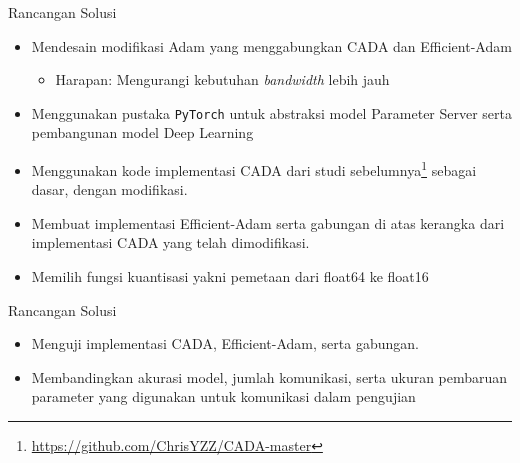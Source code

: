 \begin{frame}{Rancangan Solusi}
  \begin{itemize}
    \item Mendesain modifikasi Adam yang menggabungkan CADA \parencite{Chen2021CADA} dan Efficient-Adam \parencite{Chen2022Efficient}
          \begin{itemize}
            \item Harapan: Mengurangi kebutuhan \textit{bandwidth} lebih jauh
          \end{itemize}
    \item Menggunakan pustaka \texttt{PyTorch} untuk abstraksi model Parameter Server serta pembangunan model Deep Learning
    \item Menggunakan kode implementasi CADA dari studi sebelumnya\footnote{\url{https://github.com/ChrisYZZ/CADA-master}} sebagai dasar, dengan modifikasi.
    \item Membuat implementasi Efficient-Adam serta gabungan di atas kerangka dari implementasi CADA yang telah dimodifikasi.
    \item Memilih fungsi kuantisasi yakni pemetaan dari float64 ke float16
  \end{itemize}
\end{frame}

\begin{frame}{Rancangan Solusi}
  \begin{itemize}
    \item Menguji implementasi CADA, Efficient-Adam, serta gabungan.
    \item Membandingkan akurasi model, jumlah komunikasi, serta ukuran pembaruan parameter yang digunakan untuk komunikasi dalam pengujian
  \end{itemize}
\end{frame}

